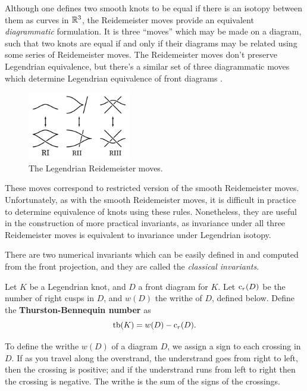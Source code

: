 Although one defines two smooth knots to be equal if there is an isotopy between them as curves in $\mathbb{R}^3$, the Reidemeister moves provide an equivalent \emph{diagrammatic} formulation.
It is three ``moves'' which may be made on a diagram, such that two knots are equal if and only if their diagrams may be related using some series of Reidemeister moves.
The Reidemeister moves don't preserve Legendrian equivalence, but there's a similar set of three diagrammatic moves which determine Legendrian equivalence of front diagrams  \cite{swiatkowski}.

\begin{figure}[ht]
    \centering
    \includegraphics[width=0.4\textwidth]{images/redeimeister.pdf}
    \caption{The Legendrian Reidemeister moves.}%
    \label{fig:redemeister}
\end{figure}

These moves correspond to restricted version of the smooth Reidemeister moves.
Unfortunately, as with the smooth Reidemeister moves, it is difficult in practice to determine equivalence of knots using these rules. Nonetheless, they are useful in the construction of more practical invariants, as invariance under all three Reidemeister moves is equivalent to invariance under Legendrian isotopy.

There are two numerical invariants which can be easily defined in and computed from the front projection, and they are called the \emph{classical invariants}.
\begin{definition}
    Let $K$ be a Legendrian knot, and $D$ a front diagram for $K$. Let $\operatorname{c}_r(D)$ be the number of right cusps in $D$, and $w(D)$ the writhe of $D$, defined below.
    Define the \textbf{Thurston-Bennequin number} as
    \[
        \operatorname{tb}(K) = w(D) - \operatorname{c}_r(D).
    \]
\end{definition}
To define the writhe $w(D)$ of a diagram $D$, we assign a sign to each crossing in $D$. If as you travel along the overstrand, the understrand goes from right to left, then the crossing is positive; and if the understrand runs from left to right then the crossing is negative. The writhe is the sum of the signs of the crossings.

